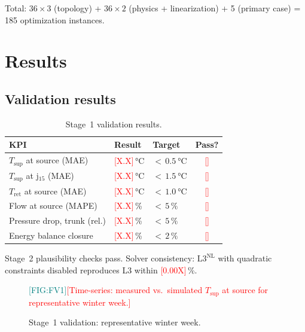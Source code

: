 \documentclass[review,3p]{elsarticle}
\newcommand{\placeholder}[1]{\textcolor{red}{[#1]}}
\newcommand{\Lnl}{\mathrm{L3}^{\mathrm{NL}}}
\newcommand{\figref}[1]{\textcolor{teal}{[FIG:#1]}}
\begin{document}
Total: $36 \times 3$ (topology) + $36 \times 2$ (physics +
linearization) + 5 (primary case) = 185 optimization instances.

\section{Results}
\label{sec:results}

\subsection{Validation results}
\label{sec:results_validation}

\begin{table}[htbp]
\centering
\caption{Stage~1 validation results.}
\label{tab:validation_stage1}
\small
\begin{tabular}{@{} l l l c @{}}
\toprule
KPI & Result & Target & Pass? \\
\midrule
$T_{\mathrm{sup}}$ at source (MAE)
  & \placeholder{X.X}\,\si{\celsius}
  & ${<}\,\SI{0.5}{\celsius}$
  & \placeholder{\checkmark} \\
$T_{\mathrm{sup}}$ at j$_{15}$ (MAE)
  & \placeholder{X.X}\,\si{\celsius}
  & ${<}\,\SI{1.5}{\celsius}$
  & \placeholder{\checkmark} \\
$T_{\mathrm{ret}}$ at source (MAE)
  & \placeholder{X.X}\,\si{\celsius}
  & ${<}\,\SI{1.0}{\celsius}$
  & \placeholder{\checkmark} \\
Flow at source (MAPE)
  & \placeholder{X.X}\,\%
  & ${<}\,5\,\%$
  & \placeholder{\checkmark} \\
Pressure drop, trunk (rel.)
  & \placeholder{X.X}\,\%
  & ${<}\,5\,\%$
  & \placeholder{\checkmark} \\
Energy balance closure
  & \placeholder{X.X}\,\%
  & ${<}\,2\,\%$
  & \placeholder{\checkmark} \\
\bottomrule
\end{tabular}
\end{table}

Stage~2 plausibility checks pass. Solver consistency: $\Lnl$ with
quadratic constraints disabled reproduces L3 within
\placeholder{0.00X}\,\%.

\begin{figure}[htbp]
  \centering
  \figref{FV1}\quad\placeholder{Time-series: measured vs.\ simulated
  $T_{\mathrm{sup}}$ at source for representative winter week.}
  \caption{Stage~1 validation: representative winter week.}
  \label{fig:val_timeseries}
\end{figure}
\end{document}
